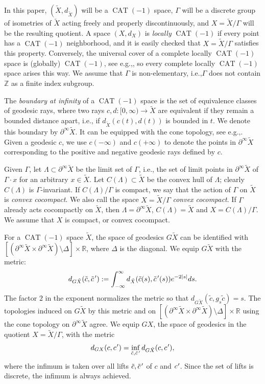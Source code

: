 \documentclass[11pt]{article}
\newcommand{\ie}{i.e.,\xspace}
\newcommand{\eg}{e.g.,\xspace}
\newcommand{\cpr}{c\mkern1mu'}
\newcommand{\tcpr}{\tilde c\mkern2mu'}
\theoremstyle{definition}
\numberwithin{equation}{section}
\DeclareMathOperator{\CAT}{CAT}
\begin{document}
In this paper, $(\tilde X, d_{\tilde X})$ will be a $\CAT(-1)$ space, $\Gamma$ will be a discrete group of isometries of $\tilde X$ acting freely and properly discontinuously, and $X=\tilde X/\Gamma$ will be the resulting quotient. A space $(X,d_X)$ is \emph{locally} $\CAT(-1)$ if every point has a $\CAT(-1)$ neighborhood, and it is easily checked that $X=\tilde X/\Gamma$ satisfies this property. Conversely, the universal cover of a complete locally $\CAT(-1)$ space is (globally) $\CAT(-1)$, see \eg \cite[Th.\,II.4.1]{bh}, so every complete locally $\CAT(-1)$ space arises this way. We assume that $\Gamma$ is non-elementary, \ie $\Gamma$ does not contain $\mathbb{Z}$ as a finite index subgroup.

The \emph{boundary at infinity} of a $\CAT(-1)$ space is the set of equivalence classes of geodesic rays, where two rays $c,d:[0,\infty) \to \tilde X$ are equivalent if they remain a bounded distance apart, \ie if $d_{\tilde X}(c(t), d(t))$ is bounded in $t$. We denote this boundary by $\partial^\infty \tilde X$. It can be equipped with the cone topology, see \eg \cite[Chap.\,II.8]{bh}. Given a geodesic $c$, we use $c(-\infty)$ and $c(+\infty)$ to denote the points in $\partial^\infty \tilde X$ corresponding to the positive and negative geodesic rays defined by $c$.

Given $\Gamma$, let $\Lambda \subset \partial^\infty \tilde X$ be the limit set of $\Gamma$, \ie the set of limit points in $\partial^\infty\tilde X$ of $\Gamma\cdot x$ for an arbitrary $x\in \tilde X$. Let $C(\Lambda) \subset \tilde X$ be the convex hull of $\Lambda$; clearly $C(\Lambda)$ is $\Gamma$\nobreakdash-invariant. If $C(\Lambda)/\Gamma$ is compact, we say that the action of $\Gamma$ on $\tilde X$ is \emph{convex cocompact}. We also call the space $X=\tilde X/\Gamma$ \emph{convex cocompact}. If $\Gamma$ already acts cocompactly on $\tilde X$, then $\Lambda=\partial^\infty \tilde X$, $C(\Lambda) = \tilde X$ and $X= C(\Lambda)/\Gamma$. We assume that $X$ is compact, or convex cocompact.

For a $\CAT(-1)$ space $\tilde X$, the space of geodesics $G\tilde X$ can be identified with \hbox{$[(\partial^\infty\tilde X \times \partial^\infty\tilde X)\setminus \Delta] \times \mathbb{R}$}, where $\Delta$ is the diagonal. We equip $G\tilde X$ with the metric:
\[ d_{G\tilde X}(\tilde c,\tcpr) := \int_{-\infty}^\infty d_{\tilde X}(\tilde c(s),\tcpr(s)) e^{-2|s|}ds.\]
The factor $2$ in the exponent normalizes the metric so that $d_{G\tilde X}(\tilde c, g_s \tilde c)=s$. The topologies induced on $G\tilde X$ by this metric and on $[(\partial^\infty\tilde X \times \partial^\infty\tilde X)\setminus \Delta] \times \mathbb{R}$ using the cone topology on $\partial^\infty \tilde X$ agree.
We equip $GX$, the space of geodesics in the quotient $X=\tilde X/\Gamma$, with the metric
\[ d_{GX}(c,\cpr) = \inf_{\tilde c,\tcpr} d_{G\tilde X}(c,\cpr),\]
where the infimum is taken over all lifts $\tilde c, \tcpr$ of $c$ and $\cpr$. Since the set of lifts is discrete, the infimum is always achieved.
\end{document}
